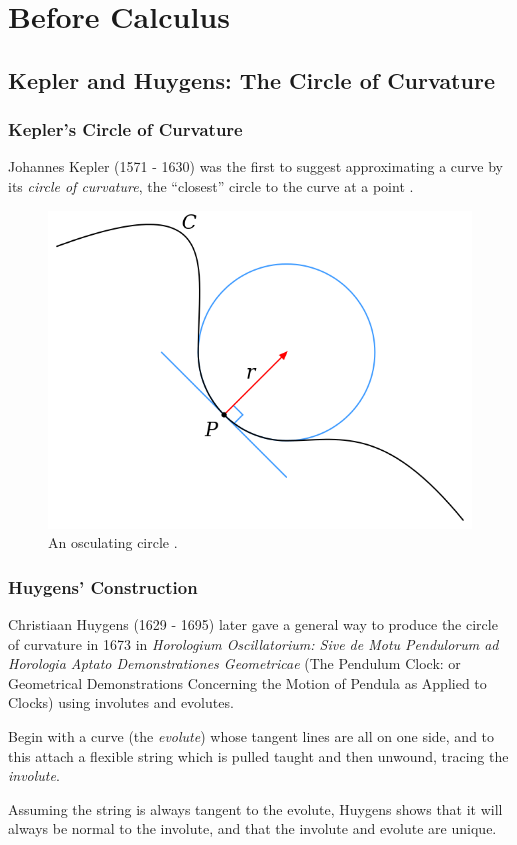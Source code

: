 \documentclass{beamer}
\theoremstyle{definition}
\begin{document}
\section{Before Calculus}

\subsection{Kepler and Huygens: The Circle of Curvature}

\begin{frame}
    \frametitle{Kepler's Circle of Curvature}

    Johannes Kepler (1571 - 1630) was the first to suggest approximating a curve by
    its \emph{circle of curvature}, the ``closest'' circle to the curve at a point
    \cite{unsat-hist}.

    \begin{figure}
        \centering
        \includegraphics[width=.5\textwidth]{images/Osculating_circle.svg.png}
        \caption{An osculating circle \cite{intern-et-al}.}
    \end{figure}
\end{frame}

\begin{frame}
    \frametitle{Huygens' Construction}

    Christiaan Huygens (1629 - 1695) later gave a general way to produce the
    circle of curvature in 1673 in \textit{Horologium Oscillatorium: Sive de Motu Pendulorum
    ad Horologia Aptato Demonstrationes Geometricae}
    (The Pendulum Clock: or Geometrical Demonstrations Concerning the Motion of Pendula as
    Applied to Clocks) using involutes and evolutes.

    Begin with a curve (the \emph{evolute}) whose tangent lines are all on one side,
    and to this attach a flexible string which is pulled taught and then unwound,
    tracing the \emph{involute}.

    Assuming the string is always tangent to the evolute, Huygens shows that it will
    always be normal to the involute, and that the involute and evolute are unique.

\end{frame}
\end{document}
